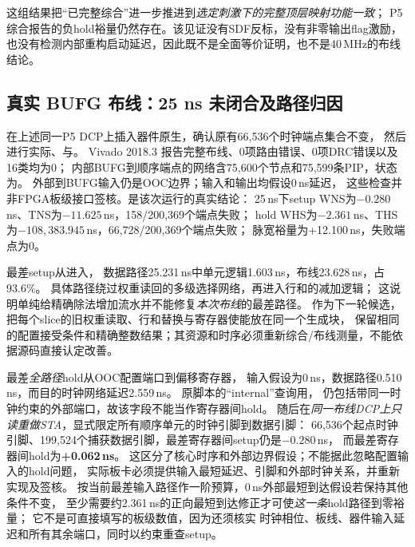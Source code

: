 这组结果把“已完整综合”进一步推进到\emph{选定刺激下的完整顶层映射功能一致}；
P5综合报告的负hold裕量仍然存在。该见证没有SDF反标，没有非零输出flag激励，
也没有检测内部重构启动延迟，因此既不是全面等价证明，也不是40\,MHz的布线结论。

\subsection{真实 BUFG 布线：25 ns 未闭合及路径归因}
在上述同一P5 DCP上插入器件原生，确认原有66,536个时钟端点集合不变，
然后进行实际、与。
Vivado 2018.3 报告完整布线、0项路由错误、0项DRC错误以及16类均为0；
内部BUFG到顺序端点的网络含75,600个节点和75,599条PIP，状态为。
外部到BUFG输入仍是OOC边界；输入和输出均假设0\,ns延迟，
这些检查并非FPGA板级接口签核。是该次运行的真实结论：
25\,ns下setup WNS为$-0.280$\,ns、TNS为$-11.625$\,ns，158/200,369个端点失败；
hold WHS为$-2.361$\,ns、THS为$-108,383.945$\,ns，66,728/200,369个端点失败；
脉宽裕量为+12.100\,ns，失败端点为0。

最差setup从进入，
数据路径25.231\,ns中单元逻辑1.603\,ns，布线23.628\,ns，占93.6\%。
具体路径绕过权重读回的多级选择网络，再进入行和的减加逻辑；
这说明单纯给精确除法增加流水并不能修复\emph{本次布线}的最差路径。
作为下一轮候选，把每个slice的旧权重读取、行和替换与寄存器使能放在同一个生成块，
保留相同的配置接受条件和精确整数结果；其资源和时序必须重新综合/布线测量，不能依据源码直接认定改善。

最差\emph{全路径}hold从OOC配置端口到偏移寄存器，
输入假设为0\,ns，数据路径0.510\,ns，而目的时钟网络延迟2.559\,ns。
原脚本的“internal”查询用，
仍包括带同一时钟约束的外部端口，故该字段不能当作寄存器间hold。
随后在\emph{同一布线DCP上只读重做STA}，显式限定所有顺序单元的时钟引脚到数据引脚：
66,536个起点时钟引脚、199,524个捕获数据引脚，最差寄存器间setup仍是$-0.280$\,ns，
而最差寄存器间hold为\textbf{+0.062\,ns}。
这区分了核心时序和外部边界假设；不能据此忽略配置输入的hold问题，
实际板卡必须提供输入最短延迟、引脚和外部时钟关系，并重新实现及签核。
按当前最差输入路径作一阶预算，0\,ns外部最短到达假设若保持其他条件不变，
至少需要约2.361\,ns的正向最短到达修正才可使\emph{这一条}hold路径到零裕量；
它不是可直接填写的板级数值，因为还须核实
时钟相位、板线、器件输入延迟和所有其余端口，同时以约束重查setup。

